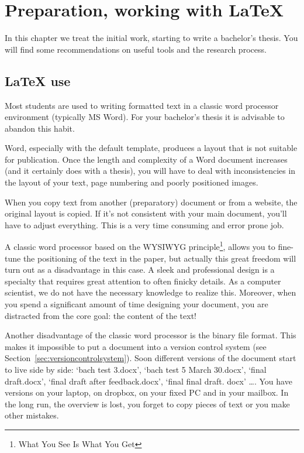 \chapter{Preparation, working with \LaTeX{}}
\label{ch:preparation}

In this chapter we treat the initial work, starting to write a bachelor's thesis. You will find some recommendations on useful tools and the research process.

\section{{\LaTeX} use}
\label{sec:latex-use}

Most students are used to writing formatted text in a classic word processor environment (typically MS Word). For your bachelor's thesis it is advisable to abandon this habit.

Word, especially with the default template, produces a layout that is not suitable for publication. Once the length and complexity of a Word document increases (and it certainly does with a thesis), you will have to deal with inconsistencies in the layout of your text, page numbering and poorly positioned images.

When you copy text from another (preparatory) document or from a website, the original layout is copied. If it's not consistent with your main document, you'll have to adjust everything. This is a very time consuming and error prone job.

A classic word processor based on the WYSIWYG principle\footnote{What You See Is What You Get}, allows you to fine-tune the positioning of the text in the paper, but actually this great freedom will turn out as a disadvantage in this case. A sleek and professional design is a specialty that requires great attention to often finicky details. As a computer scientist, we do not have the necessary knowledge to realize this. Moreover, when you spend a significant amount of time designing your document, you are distracted from the core goal: the content of the text!

Another disadvantage of the classic word processor is the binary file format. This makes it impossible to put a document into a version control system (see Section~\ref{sec:versioncontrolsystem}). Soon different versions of the document start to live side by side: `bach ​​test 3.docx', `bach ​​test 5 March 30.docx', `final draft.docx', `final draft after feedback.docx', `final final draft. docx' \dots. You have versions on your laptop, on dropbox, on your fixed PC and in your mailbox. In the long run, the overview is lost, you forget to copy pieces of text or you make other mistakes.

